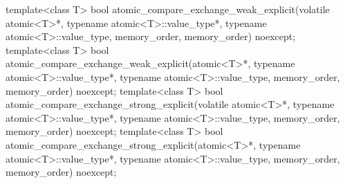 \begin{codeblock}
{  template<class T>
    bool atomic_compare_exchange_weak_explicit(volatile atomic<T>*,
                                               typename atomic<T>::value_type*,
                                               typename atomic<T>::value_type,
                                               memory_order, memory_order) noexcept;
  template<class T>
    bool atomic_compare_exchange_weak_explicit(atomic<T>*,
                                               typename atomic<T>::value_type*,
                                               typename atomic<T>::value_type,
                                               memory_order, memory_order) noexcept;
  template<class T>
    bool atomic_compare_exchange_strong_explicit(volatile atomic<T>*,
                                                 typename atomic<T>::value_type*,
                                                 typename atomic<T>::value_type,
                                                 memory_order, memory_order) noexcept;
  template<class T>
    bool atomic_compare_exchange_strong_explicit(atomic<T>*,
                                                 typename atomic<T>::value_type*,
                                                 typename atomic<T>::value_type,
                                                 memory_order, memory_order) noexcept;

}
\end{codeblock}
